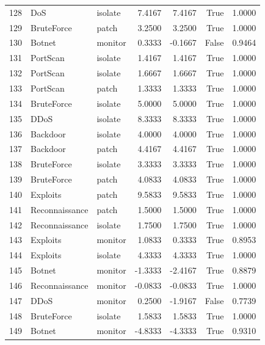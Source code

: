 \begin{table}
\begin{tabular}{rllrrrr}
128 & DoS & isolate & 7.4167 & 7.4167 & True & 1.0000 \\
129 & BruteForce & patch & 3.2500 & 3.2500 & True & 1.0000 \\
130 & Botnet & monitor & 0.3333 & -0.1667 & False & 0.9464 \\
131 & PortScan & isolate & 1.4167 & 1.4167 & True & 1.0000 \\
132 & PortScan & isolate & 1.6667 & 1.6667 & True & 1.0000 \\
133 & PortScan & patch & 1.3333 & 1.3333 & True & 1.0000 \\
134 & BruteForce & isolate & 5.0000 & 5.0000 & True & 1.0000 \\
135 & DDoS & isolate & 8.3333 & 8.3333 & True & 1.0000 \\
136 & Backdoor & isolate & 4.0000 & 4.0000 & True & 1.0000 \\
137 & Backdoor & patch & 4.4167 & 4.4167 & True & 1.0000 \\
138 & BruteForce & isolate & 3.3333 & 3.3333 & True & 1.0000 \\
139 & BruteForce & patch & 4.0833 & 4.0833 & True & 1.0000 \\
140 & Exploits & patch & 9.5833 & 9.5833 & True & 1.0000 \\
141 & Reconnaissance & patch & 1.5000 & 1.5000 & True & 1.0000 \\
142 & Reconnaissance & isolate & 1.7500 & 1.7500 & True & 1.0000 \\
143 & Exploits & monitor & 1.0833 & 0.3333 & True & 0.8953 \\
144 & Exploits & isolate & 4.3333 & 4.3333 & True & 1.0000 \\
145 & Botnet & monitor & -1.3333 & -2.4167 & True & 0.8879 \\
146 & Reconnaissance & monitor & -0.0833 & -0.0833 & True & 1.0000 \\
147 & DDoS & monitor & 0.2500 & -1.9167 & False & 0.7739 \\
148 & BruteForce & isolate & 1.5833 & 1.5833 & True & 1.0000 \\
149 & Botnet & monitor & -4.8333 & -4.3333 & True & 0.9310 \\
\bottomrule
\end{tabular}
\end{table}
